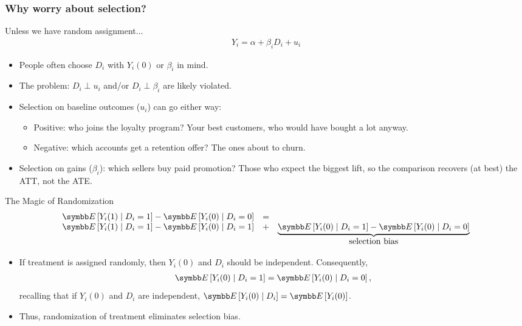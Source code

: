 \documentclass[aspectratio=169,11pt]{beamer}
\begin{document}
\begin{frame}
\frametitle{Why worry about selection?}
Unless we have random assignment...
\begin{align*}
Y_i = \alpha + \beta_i D_i + u_i
\end{align*}

\begin{itemize}
\item People often choose $D_i$ with $Y_i(0)$ or $\beta_i$ in mind.
\item The problem: $D_i \perp u_i$ and/or $D_i \perp \beta_i$ are likely violated.
\item Selection on baseline outcomes ($u_i$) can go either way:
\begin{itemize}
\item \alert{Positive}: who joins the loyalty program? Your best customers, who would have bought a lot anyway.
\item \alert{Negative}: which accounts get a retention offer? The ones about to churn.
\end{itemize}
\item Selection on gains ($\beta_i$): which sellers buy paid promotion? Those who expect the biggest lift,
so the comparison recovers (at best) the ATT, not the ATE.
\end{itemize}
\end{frame}


\begin{frame}{The Magic of Randomization}
\begin{align*}
\begin{array}{ccc}
\E\left[Y_{i}(1) \mid D_{i}=1\right]-\E\left[Y_{i}(0) \mid D_{i}=0\right] & =\\
\E\left[Y_{i}(1) \mid D_{i}=1\right]-\E\left[Y_{i}(0) \mid D_{i}=1\right] & + & \underbrace{\E\left[Y_{i}(0) \mid D_{i}=1\right]-\E\left[Y_{i}(0) \mid D_{i}=0\right]}\\
 &  & \text{selection bias}
\end{array}
\end{align*}
\begin{itemize}
  \item If treatment is assigned randomly, then $Y_{i}(0)$ and $D_{i}$ should be independent. Consequently,
  \begin{align*}
    \E\left[Y_{i}(0)\mid D_{i}=1\right]=\E\left[Y_{i}(0) \mid D_{i}=0\right],
  \end{align*}
recalling that if $Y_{i}(0)$ and $D_{i}$ are independent, $\E\left[Y_{i}(0) \mid D_{i}\right]=\E\left[Y_{i}(0)\right]$.

\item Thus, randomization of treatment eliminates selection bias.
\end{itemize}
\end{frame}
\end{document}
